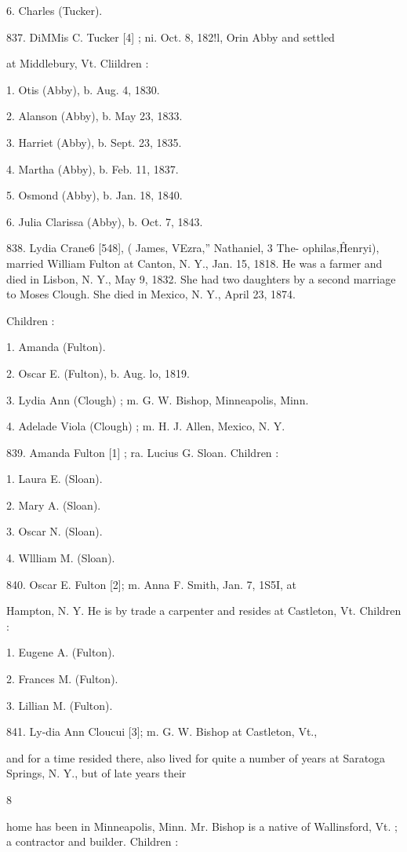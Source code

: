 6. Charles (Tucker). 

837. DiMMis C. Tucker [4] ; ni. Oct. 8, 182!l, Orin Abby and settled 

at Middlebury, Vt. Cliildren : 

1. Otis (Abby), b. Aug. 4, 1830. 

2. Alanson (Abby), b. May 23, 1833. 

3. Harriet (Abby), b. Sept. 23, 1835. 

4. Martha (Abby), b. Feb. 11, 1837. 

5. Osmond (Abby), b. Jan. 18, 1840. 

6. Julia Clarissa (Abby), b. Oct. 7, 1843. 

838. Lydia Crane6 [548], ( James, VEzra,'' Nathaniel, 3 The- 
ophilas,\^ Henryi), married William Fulton at Canton, N. Y., 
Jan. 15, 1818. He was a farmer and died in Lisbon, N. Y., 
May 9, 1832. She had two daughters by a second marriage to 
Moses Clough. She died in Mexico, N. Y., April 23, 1874. 

Children : 

1. Amanda (Fulton). 

2. Oscar E. (Fulton), b. Aug. lo, 1819. 

3. Lydia Ann (Clough) ; m. G. W. Bishop, Minneapolis, Minn. 

4. Adelade Viola (Clough) ; m. H. J. Allen, Mexico, N. Y. 

839. Amanda Fulton [1] ; ra. Lucius G. Sloan. Children : 

1. Laura E. (Sloan). 

2. Mary A. (Sloan). 

3. Oscar N. (Sloan). 

4. Wllliam M. (Sloan). 

840. Oscar E. Fulton [2]; m. Anna F. Smith, Jan. 7, 1S5I, at 

Hampton, N. Y. He is by trade a carpenter and resides at 
Castleton, Vt. Children : 

1. Eugene A. (Fulton). 

2. Frances M. (Fulton). 

3. Lillian M. (Fulton). 

841. Ly-dia Ann Cloucui [3]; m. G. W. Bishop at Castleton, Vt., 

and for a time resided there, also lived for quite a number of 
years at Saratoga Springs, N. Y., but of late years their 

8 




home has been in Minneapolis, Minn. Mr. Bishop is a native 
of Wallinsford, Vt. ; a contractor and builder. Children : 

